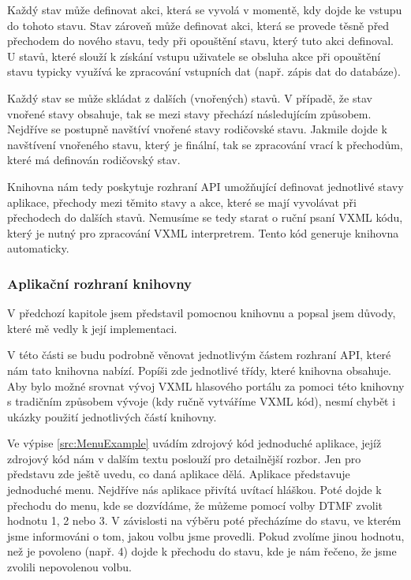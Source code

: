 \documentclass[ing,male,java,dept460]{diploma}						%
\begin{document}
Každý stav může definovat akci, která se vyvolá v momentě, kdy dojde ke vstupu do tohoto stavu. Stav zároveň může definovat akci, která se provede těsně před přechodem do nového stavu, tedy při opouštění stavu, který tuto akci definoval. U stavů, které slouží k získání vstupu uživatele se obsluha akce při opouštění stavu typicky využívá ke zpracování vstupních dat (např. zápis dat do databáze).

Každý stav se může skládat z dalších (vnořených) stavů. V případě, že stav vnořené stavy obsahuje, tak se mezi stavy přechází následujícím způsobem. Nejdříve se postupně navštíví vnořené stavy rodičovské stavu. Jakmile dojde k navštívení vnořeného stavu, který je finální, tak se zpracování vrací k přechodům, které má definován rodičovský stav.

Knihovna nám tedy poskytuje rozhraní API umožňující definovat jednotlivé stavy aplikace, přechody mezi těmito stavy a akce, které se mají vyvolávat při přechodech do dalších stavů. Nemusíme se tedy starat o ruční psaní VXML kódu, který je nutný pro zpracování VXML interpretrem. Tento kód generuje knihovna automaticky.

\subsubsection{Aplikační rozhraní knihovny}
V předchozí kapitole jsem představil pomocnou knihovnu a popsal jsem důvody, které mě vedly k její implementaci.

V této části se budu podrobně věnovat jednotlivým částem rozhraní API, které nám tato knihovna nabízí. Popíši zde jednotlivé třídy, které knihovna obsahuje. Aby bylo možné srovnat vývoj VXML hlasového portálu za pomoci této knihovny s tradičním způsobem vývoje (kdy ručně vytváříme VXML kód), nesmí chybět i ukázky použití jednotlivých částí knihovny.

Ve výpise \ref{src:MenuExample} uvádím zdrojový kód jednoduché aplikace, jejíž zdrojový kód nám v dalším textu poslouží pro detailnější rozbor. Jen pro představu zde ještě uvedu, co daná aplikace dělá. Aplikace představuje jednoduché menu. Nejdříve nás aplikace přivítá uvítací hláškou. Poté dojde k přechodu do menu, kde se dozvídáme, že můžeme pomocí volby DTMF zvolit hodnotu 1, 2 nebo 3. V závislosti na výběru poté přecházíme do stavu, ve kterém jsme informováni o tom, jakou volbu jsme provedli. Pokud zvolíme jinou hodnotu, než je povoleno (např. 4) dojde k přechodu do stavu, kde je nám řečeno, že jsme zvolili nepovolenou volbu.
\end{document}
